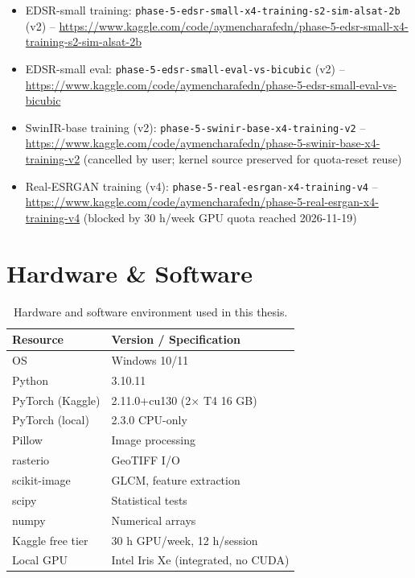 \begin{itemize}
    \item EDSR-small training: \texttt{phase-5-edsr-small-x4-training-s2-sim-alsat-2b} (v2)
        -- \url{https://www.kaggle.com/code/aymencharafedn/phase-5-edsr-small-x4-training-s2-sim-alsat-2b}
    \item EDSR-small eval: \texttt{phase-5-edsr-small-eval-vs-bicubic} (v2)
        -- \url{https://www.kaggle.com/code/aymencharafedn/phase-5-edsr-small-eval-vs-bicubic}
    \item SwinIR-base training (v2): \texttt{phase-5-swinir-base-x4-training-v2}
        -- \url{https://www.kaggle.com/code/aymencharafedn/phase-5-swinir-base-x4-training-v2}
        (cancelled by user; kernel source preserved for quota-reset reuse)
    \item Real-ESRGAN training (v4): \texttt{phase-5-real-esrgan-x4-training-v4}
        -- \url{https://www.kaggle.com/code/aymencharafedn/phase-5-real-esrgan-x4-training-v4}
        (blocked by 30 h/week GPU quota reached 2026-11-19)
\end{itemize}

\section{Hardware \& Software}

\begin{table}[h]
\centering
\caption{Hardware and software environment used in this thesis.}
\label{tab:env}
\begin{tabular}{ll}
\toprule
Resource & Version / Specification \\
\midrule
OS & Windows 10/11 \\
Python & 3.10.11 \\
PyTorch (Kaggle) & 2.11.0+cu130 (2$\times$ T4 16 GB) \\
PyTorch (local) & 2.3.0 CPU-only \\
Pillow & Image processing \\
rasterio & GeoTIFF I/O \\
scikit-image & GLCM, feature extraction \\
scipy & Statistical tests \\
numpy & Numerical arrays \\
Kaggle free tier & 30 h GPU/week, 12 h/session \\
Local GPU & Intel Iris Xe (integrated, no CUDA) \\
\bottomrule
\end{tabular}
\end{table}

